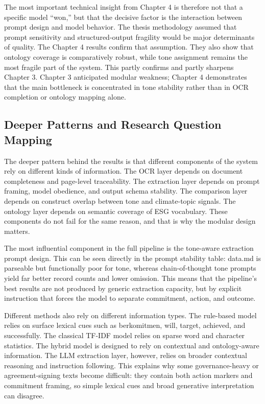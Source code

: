 The most important technical insight from Chapter 4 is therefore not that a specific model “won,” but that the decisive factor is the interaction between prompt design and model behavior. The thesis methodology assumed that prompt sensitivity and structured-output fragility would be major determinants of quality. The Chapter 4 results confirm that assumption. They also show that ontology coverage is comparatively robust, while tone assignment remains the most fragile part of the system. This partly confirms and partly sharpens Chapter 3. Chapter 3 anticipated modular weakness; Chapter 4 demonstrates that the main bottleneck is concentrated in tone stability rather than in OCR completion or ontology mapping alone.
\subsection{Deeper Patterns and Research Question Mapping}

The deeper pattern behind the results is that different components of the system rely on different kinds of information. The OCR layer depends on document completeness and page-level traceability. The extraction layer depends on prompt framing, model obedience, and output schema stability. The comparison layer depends on construct overlap between tone and climate-topic signals. The ontology layer depends on semantic coverage of ESG vocabulary. These components do not fail for the same reason, and that is why the modular design matters.

The most influential component in the full pipeline is the tone-aware extraction prompt design. This can be seen directly in the prompt stability table: data.md is parseable but functionally poor for tone, whereas chain-of-thought tone prompts yield far better record counts and lower omission. This means that the pipeline’s best results are not produced by generic extraction capacity, but by explicit instruction that forces the model to separate commitment, action, and outcome.

Different methods also rely on different information types. The rule-based model relies on surface lexical cues such as berkomitmen, will, target, achieved, and successfully. The classical TF-IDF model relies on sparse word and character statistics. The hybrid model is designed to rely on contextual and ontology-aware information. The LLM extraction layer, however, relies on broader contextual reasoning and instruction following. This explains why some governance-heavy or agreement-signing texts become difficult: they contain both action markers and commitment framing, so simple lexical cues and broad generative interpretation can disagree.

